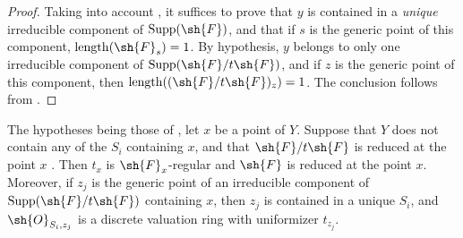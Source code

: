 \begin{proof}
Taking into account , it suffices to prove that $y$ is contained in a \emph{unique} irreducible component of $\operatorname{Supp}(\sh{F})$, and that if $s$ is the generic point of this component, $\operatorname{length}(\sh{F}_s)=1$.
By hypothesis, $y$ belongs to only one irreducible component of $\operatorname{Supp}(\sh{F}/t\sh{F})$, and if $z$ is the generic point of this component, then $\operatorname{length}((\sh{F}/t\sh{F})_z)=1$.
The conclusion follows from .
\end{proof}

\begin{proposition}[3.4.6]
\label{IV.3.4.6}
The hypotheses being those of , let $x$ be a point of $Y$.
Suppose that $Y$ does not contain any of the $S_i$ containing $x$, and that $\sh{F}/t\sh{F}$ is reduced at the point $x$ .
Then $t_x$ is $\sh{F}_x$-regular and $\sh{F}$ is reduced at the point $x$.
Moreover, if $z_j$ is the generic point of an irreducible component of $\operatorname{Supp}(\sh{F}/t\sh{F})$ containing $x$, then $z_j$ is contained in a unique $S_i$, and $\sh{O}_{S_i,z_j}$ is a discrete valuation ring with uniformizer $t_{z_j}$.
\end{proposition}

